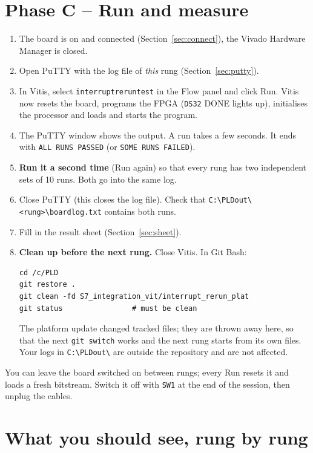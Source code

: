 \documentclass[11pt,a4paper]{article}
\newcommand{\code}[1]{\texttt{#1}}
\newcommand{\bs}{\textbackslash\allowbreak{}}
\renewcommand{\_}{\oldunderscore\allowbreak{}}
\newcommand{\out}[1]{\code{C:\bs PLD\_out\bs #1}}
\newcommand{\menu}[1]{\textsf{#1}}
\begin{document}
\section{Phase C -- Run and measure}\label{sec:run}
\begin{enumerate}
  \item The board is on and connected (Section~\ref{sec:connect}), the Vivado Hardware Manager is closed.
  \item Open PuTTY with the log file of \emph{this} rung (Section~\ref{sec:putty}).
  \item In Vitis, select \code{interrupt\_rerun\_test} in the \menu{Flow} panel and click \menu{Run}. Vitis now resets the board, programs the FPGA (\code{DS32} DONE lights up), initialises the processor and loads and starts the program.
  \item The PuTTY window shows the output. A run takes a few seconds. It ends with \code{ALL RUNS PASSED} (or \code{SOME RUNS FAILED}).
  \item \textbf{Run it a second time} (\menu{Run} again) so that every rung has two independent sets of 10 runs. Both go into the same log.
  \item Close PuTTY (this closes the log file). Check that \out{<rung>\bs board\_log.txt} contains both runs.
  \item Fill in the result sheet (Section~\ref{sec:sheet}).
  \item \textbf{Clean up before the next rung.} Close Vitis. In Git Bash:
\begin{lstlisting}
cd /c/PLD
git restore .
git clean -fd S7_integration_vit/interrupt_rerun_plat
git status                # must be clean
\end{lstlisting}
  The platform update changed tracked files; they are thrown away here, so that the next \code{git switch} works and the next rung starts from its own files. Your logs in \out{} are outside the repository and are not affected.
\end{enumerate}
You can leave the board switched on between rungs; every \menu{Run} resets it and loads a fresh bitstream. Switch it off with \code{SW1} at the end of the session, then unplug the cables.

\section{What you should see, rung by rung}\label{sec:expected}
\end{document}
